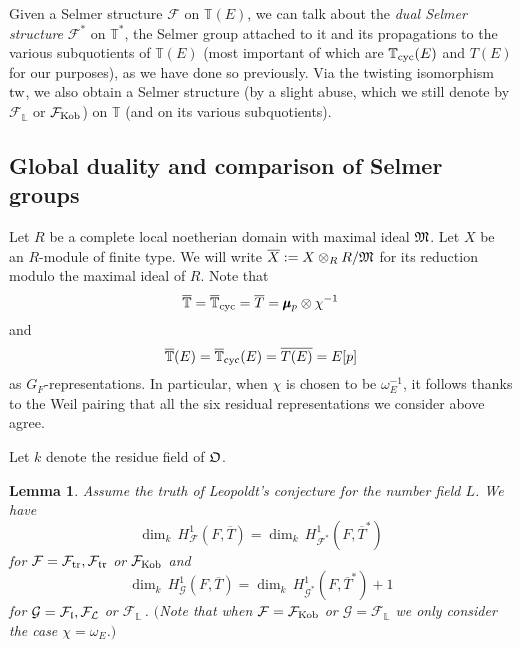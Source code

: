 \documentclass[12pt]{amsart}
\numberwithin{equation}{section}
\newtheorem{lemma}[thm]{Lemma}
\begin{document}
Given a Selmer structure ${\mathcal{F}}$ on ${\mathbb{T}}(E)$, we can talk about the \emph{dual Selmer structure} ${\mathcal{F}}^*$ on ${\mathbb{T}}^*$, the Selmer group attached to it and its propagations to the various subquotients of ${\mathbb{T}}(E)$ (most important of which are ${\mathbb{T}}_{\textup{cyc}}(E)$ and $T(E)$ for our purposes), as we have done so previously. Via the twisting isomorphism $\textup{tw}$, we also obtain a Selmer structure (by a slight abuse, which we still denote by ${\mathcal{F}}_\mathbb{L}$ or ${\mathcal{F}}_{\textup{Kob}}$) on ${\mathbb{T}}$ (and on its various subquotients). 
\subsection{Global duality and comparison of Selmer groups}
\label{subsec:compareselmer}
Let $R$ be a complete local noetherian domain with maximal ideal $\frak{M}$. Let $X$ be an $R$-module of finite type. We will write $\overline{X}:=X\otimes_R R/\frak{M}$ for its reduction modulo the maximal ideal of $R$. Note that 
$$\overline{\mathbb{T}}=\overline{\mathbb{T}}_{\textup{cyc}}=\overline{T}=\pmb{\mu}_p\otimes\chi^{-1}$$ 
and
$$\overline{\mathbb{T}}(E)=\overline{\mathbb{T}}_{\textup{cyc}}(E)=\overline{T(E)}=E[p]$$
as $G_F$-representations. 
In particular, when $\chi$ is chosen to be $\omega_E^{-1}$, it follows thanks to the Weil pairing that all the six residual representations we consider above agree.

Let $k$ denote the residue field of ${\frak{O}}$.
\begin{lemma}
\label{lem:comparefirststep} Assume the truth of Leopoldt's conjecture for the number field $L$. We have
$$\dim_{k}\, H^1_{\mathcal{F}}(F,\overline{T})=\dim_{k}\, H^1_{{\mathcal{F}}^*}(F,\overline{T}^*)$$
for ${\mathcal{F}}={\mathcal{F}}_\textup{tr},{\mathcal{F}}_\frak{tr}$ or ${\mathcal{F}}_\textup{Kob}$ and 
$$\dim_{k}\, H^1_{\mathcal{G}}(F,\overline{T})=\dim_{k}\, H^1_{\mathcal{G}^*}(F,\overline{T}^*)+1$$
for $\mathcal{G}={\mathcal{F}}_\frak{l}, {\mathcal{F}}_\mathcal{L}$ or ${\mathcal{F}}_\mathbb{L}$\,. $($Note that when ${\mathcal{F}}={\mathcal{F}}_\textup{Kob}$ or $\mathcal{G}={\mathcal{F}}_{\mathbb{L}}$ we only consider the case $\chi=\omega_E$.$)$
\end{lemma}
\end{document}
